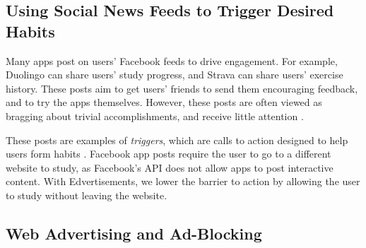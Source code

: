 \documentclass{sigchi}
\begin{document}
\subsection{Using Social News Feeds to Trigger Desired Habits}


Many apps post on users' Facebook feeds to drive engagement. %
For example, Duolingo can share users' study progress, and Strava can share users' exercise history.
These posts aim to get users' friends to send them encouraging feedback, and to try the apps themselves.
However, these posts are often viewed as bragging about trivial accomplishments, and receive little attention \cite{socialsharing}. %

These posts are examples of \textit{triggers}, which are calls to action designed to help users form habits \cite{foggpersuasive}. Facebook app posts require the user to go to a different website to study, as Facebook's API does not allow apps to post interactive content. With Edvertisements, we lower the barrier to action by allowing the user to study without leaving the website.


\pagebreak

\subsection{Web Advertising and Ad-Blocking}
\end{document}

